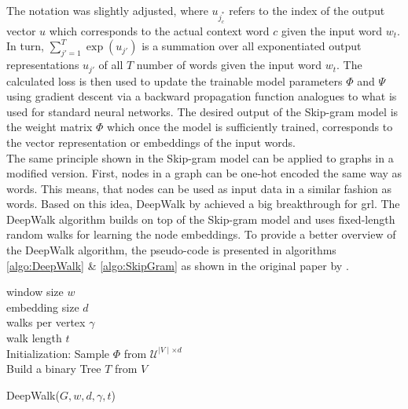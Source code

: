 	\noindent The notation was slightly adjusted, where $u_{j_{c}^{*}}$ refers
	to the index of the output vector $u$ which corresponds to the actual
	context word $c$ given the input word $w_{t}$. In turn, 
	$\sum_{j'=1}^{T}\exp(u_{j'})$ is a summation over all exponentiated output 
	representations $u_{j'}$ of all $T$ number of words given the input word 
	$w_{t}$. The calculated loss is then used to update the trainable model 
	parameters $\Phi$ and $\Psi$ using gradient descent via a backward 
	propagation function \citep{werbos1974beyond} analogues to what is used for 
	standard neural networks. The desired output of the Skip-gram model is the 
	weight matrix $\Phi$ which once the model is sufficiently trained, 
	corresponds to the
	vector representation or embeddings of the input words. \\

	\noindent The same principle shown in the Skip-gram model can be applied
	to graphs in a modified version. First, nodes in a graph can be one-hot
	encoded the same way as words. This means, that nodes can be used as input
	data in a similar fashion as words. Based on this idea, DeepWalk by
	\cite{perozzi2014deepwalk} achieved a big breakthrough for \acs{grl}. The 
	DeepWalk algorithm builds on top of the Skip-gram model and uses 
	fixed-length random walks for learning the node embeddings. To provide a 
	better overview of the DeepWalk algorithm, the pseudo-code is presented in 
	algorithms \ref{algo:DeepWalk} \& \ref{algo:SkipGram} as shown in the
	original paper by \citeauthor{perozzi2014deepwalk} \citeyearpar[p. 704]{perozzi2014deepwalk}.
	
	\begin{algorithm}[h]
		\scriptsize
		\SetAlgoLined
		window size $w$\\
		embedding size $d$\\
		walks per vertex $\gamma$\\
		walk length $t$\\
		\nl Initialization: Sample $\Phi$ from $\mathcal{U}^{\mid V
		\mid \times d}$ \\
		\nl Build a binary Tree $T$ from $V$ \\
		\nl {}
		\caption[DeepWalk]{DeepWalk($G,w,d,\gamma,t$)}
		\label{algo:DeepWalk}
	\end{algorithm}
	
